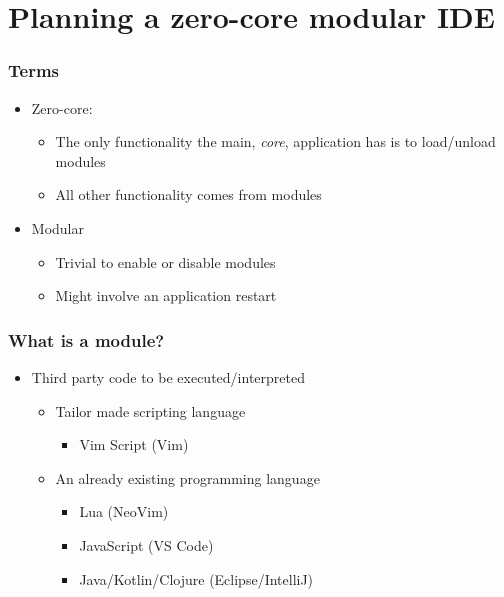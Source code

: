 \section{Planning a zero-core modular IDE}
\SectionPage

\begin{frame}
  \frametitle{Terms}
  \begin{itemize}
    \item Zero-core:
      \pause
      \begin{itemize}
        \item The only functionality the main, \textit{core}, application has is
          to load/unload modules
          \pause
        \item All other functionality comes from modules
      \end{itemize}
    \item Modular
      \pause
      \begin{itemize}
        \item Trivial to enable or disable modules
          \pause
        \item Might involve an application restart
      \end{itemize}
  \end{itemize}
\end{frame}

\begin{frame}
  \frametitle{What is a module?}
  \begin{itemize}
    \item Third party code to be executed/interpreted
      \pause
      \begin{itemize}
        \item Tailor made scripting language
          \pause
          \begin{itemize}
            \item Vim Script (Vim)
              \pause
          \end{itemize}
        \item An already existing programming language
          \pause
          \begin{itemize}
            \item Lua (NeoVim)
              \pause
            \item JavaScript (VS Code)
              \pause
            \item Java/Kotlin/Clojure (Eclipse/IntelliJ)
          \end{itemize}
      \end{itemize}
  \end{itemize}
\end{frame}

